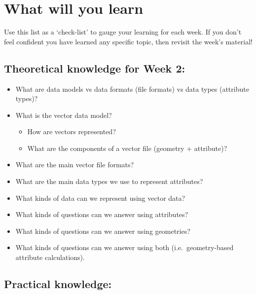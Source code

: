 \documentclass[
  letterpaper,
  DIV=11,
  numbers=noendperiod]{scrreprt}
\providecommand{\tightlist}{%
  \setlength{\itemsep}{0pt}\setlength{\parskip}{0pt}}\usepackage{longtable,booktabs,array}
\begin{document}
\section*{What will you learn}\label{what-will-you-learn-1}


Use this list as a `check-list' to gauge your learning for each week. If
you don't feel confident you have learned any specific topic, then
revisit the week's material!

\subsection*{Theoretical knowledge for Week
2:}\label{theoretical-knowledge-for-week-2}

\begin{itemize}
\tightlist
\item
  What are data models vs data formats (file formats) vs data types
  (attribute types)?
\item
  What is the vector data model?

  \begin{itemize}
  \tightlist
  \item
    How are vectors represented?
  \item
    What are the components of a vector file (geometry + attribute)?
  \end{itemize}
\item
  What are the main vector file formats?
\item
  What are the main data types we use to represent attributes?
\item
  What kinds of data can we represent using vector data?
\item
  What kinds of questions can we answer using attributes?
\item
  What kinds of questions can we answer using geometries?
\item
  What kinds of questions can we answer using both (i.e.~geometry-based
  attribute calculations).
\end{itemize}

\subsection*{Practical knowledge:}\label{practical-knowledge-1}
\end{document}
